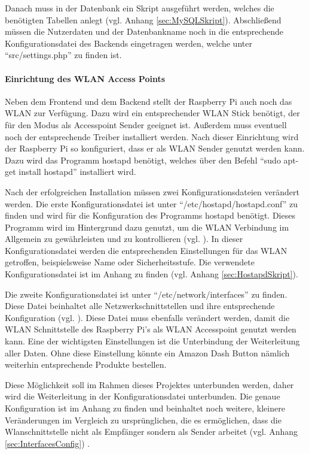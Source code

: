 Danach muss in der Datenbank ein Skript ausgeführt werden, welches die benötigten Tabellen anlegt (vgl. Anhang \ref{sec:MySQLSkript}). Abschließend müssen die Nutzerdaten und der Datenbankname noch in die entsprechende Konfigurationsdatei des Backends eingetragen werden, welche unter ``src/settings.php'' zu finden ist. 

\paragraph{Einrichtung des WLAN Access Points}$\;$ \\ 
\label{sec:Einrichtung des WLAN Access Points-1} 
Neben dem Frontend und dem Backend stellt der Raspberry Pi auch noch das WLAN zur Verfügung. Dazu wird ein entsprechender WLAN Stick benötigt, der für den Modus als Accesspoint Sender geeignet ist. Außerdem muss eventuell noch der entsprechende Treiber installiert werden. Nach dieser Einrichtung wird der Raspberry Pi so konfiguriert, dass er als WLAN Sender genutzt werden kann. Dazu wird das Programm hostapd benötigt, welches über den Befehl ``sudo apt-get install hostapd'' installiert wird. 

Nach der erfolgreichen Installation müssen zwei Konfigurationsdateien verändert werden. Die erste Konfigurationsdatei ist unter ``/etc/hostapd/hostapd.conf'' zu finden und wird für die Konfiguration des Programms hostapd benötigt. Dieses Programm wird im Hintergrund dazu genutzt, um die WLAN Verbindung im Allgemein zu gewährleisten und zu kontrollieren (vgl. \cite{.o}\cite{.n}). In dieser Konfigurationsdatei werden die entsprechenden Einstellungen für das WLAN getroffen, beispielsweise Name oder Sicherheitsstufe. Die verwendete Konfigurationsdatei ist im Anhang zu finden (vgl. Anhang \ref{sec:HostapdSkript}).

Die zweite Konfigurationsdatei ist unter ``/etc/network/interfaces'' zu finden. Diese Datei beinhaltet alle Netzwerkschnittstellen und ihre entsprechende Konfiguration (vgl. \cite{.p}). Diese Datei muss ebenfalls verändert werden, damit die WLAN Schnittstelle des Raspberry Pi's als WLAN Accesspoint genutzt werden kann. Eine der wichtigsten Einstellungen ist die Unterbindung der Weiterleitung aller Daten. Ohne diese Einstellung könnte ein Amazon Dash Button nämlich weiterhin entsprechende Produkte bestellen. 

Diese Möglichkeit soll im Rahmen dieses Projektes unterbunden werden, daher wird die Weiterleitung in der Konfigurationsdatei unterbunden. Die genaue Konfiguration ist im Anhang zu finden und beinhaltet noch weitere, kleinere Veränderungen im Vergleich zu ursprünglichen, die es ermöglichen, dass die Wlanschnittstelle nicht als Empfänger sondern als Sender arbeitet (vgl. Anhang \ref{sec:InterfacesConfig}) .

